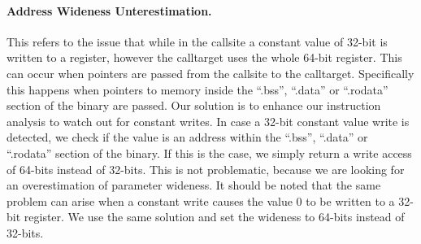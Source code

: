 \paragraph{Address Wideness Unterestimation.} This refers to the issue that while in the callsite a constant value of 32-bit is written to a register, however 
the calltarget uses the whole 64-bit register. This can occur when pointers are passed from the callsite to the calltarget. Specifically this happens 
when pointers to memory inside the ``.bss'', ``.data'' or ``.rodata'' section of the binary are passed.
Our solution is to enhance our instruction analysis to watch out for constant writes. In case a 32-bit constant value write is detected, we check if the
value is an address within the ``.bss'', ``.data'' or ``.rodata'' section of the binary. If this is the case, we simply return a write access of 64-bits 
instead of 32-bits. This is not problematic, because we are looking for an overestimation of parameter wideness.
It should be noted that the same problem can arise when a constant write causes the value 0 to be written to a 32-bit register. We use the same solution
and set the wideness to 64-bits instead of 32-bits.
%
%
%
